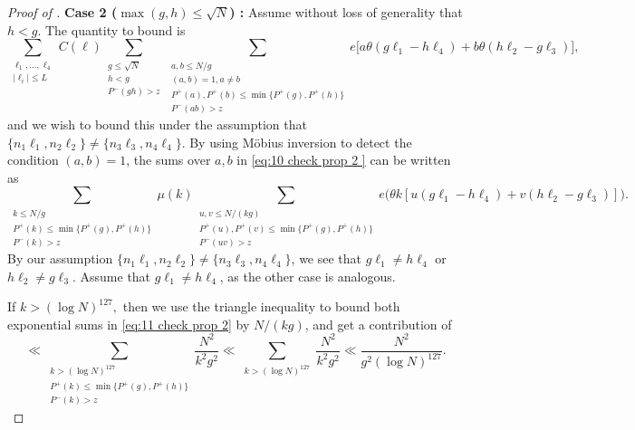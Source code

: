 \documentclass[12pt]{amsart}
\renewcommand{\leq}{\leqslant}
\numberwithin{equation}{section}
\theoremstyle{plain}
\theoremstyle{definition}
\renewcommand{\l}{\ell}
\begin{document}
\begin{proof}[Proof of ]
		
		\textbf{Case 2 ($\max(g,h) \leq \sqrt{N}$) : } Assume without loss of generality that $h < g$. The quantity to bound is
		\begin{equation}\label{eq:10 check prop 2 }
			\sum_{\substack{\l_1,\dots,\l_4 \\ |\l_i| \leq L}} C(\bm{\l}) \sum_{\substack{g \leq \sqrt{N} \\ h < g \\ P^-(gh) > z }}  \sum_{\substack{a,b \leq N/g \\ (a,b) = 1, a \ne b  \\  P^+(a),P^+(b) \leq  \min\{P^+(g),P^+(h)\}  \\ P^-(ab) > z}} e\Big[a\theta(g\l_1-h\l_4)+b\theta(h\l_2-g\l_3)\Big] ,
		\end{equation}
		and we wish to bound this under the assumption that $\{n_1\l_1,n_2\l_2\} \ne \{n_3\l_3,n_4\l_4\}$. By using M\"obius inversion to detect the condition $(a,b) = 1$, the sums over $a,b$ in \eqref{eq:10 check prop 2 } can be written as
		\begin{equation}\label{eq:11 check prop 2}
			\sum_{\substack{k \leq N/g \\ P^+(k) \leq \min\{P^+(g),P^+(h)\} \\ P^-(k) >z}}\mu(k) \sum_{\substack{u,v \leq N/(kg) \\ P^+(u),P^+(v) \leq \min\{P^+(g),P^+(h)\}\\ P^-(uv) > z}}e\big(\theta k [u(g \l_1 - h\l_4) + v(h\l_2-g\l_3)]\big).
		\end{equation}
		By our assumption $\{n_1\l_1,n_2\l_2\} \ne \{n_3\l_3,n_4\l_4\}$, we see that $g\l_1 \ne h\l_4$ or $h\l_2 \ne g\l_3$. Assume that $g\l_1 \ne h\l_4$, as the other case is analogous.
		
		If $k > (\log N)^{127},$ then we use the triangle inequality to bound both exponential sums in \eqref{eq:11 check prop 2} by $N/(kg)$, and get a contribution of
		\begin{equation}\label{eq:12 check prop 2}
			\ll \sum_{\substack{k>(\log N)^{127} \\ P^+(k) \leq \min\{P^+(g),P^+(h)\} \\ P^-(k) >z }}\frac{N^2}{k^2 g^2 } \ll \sum_{\substack{k>(\log N)^{127}}}\frac{N^2}{k^2 g^2 } \ll \frac{N^2}{g^2 (\log N)^{127}}.
		\end{equation}
		

\end{proof}
\end{document}
